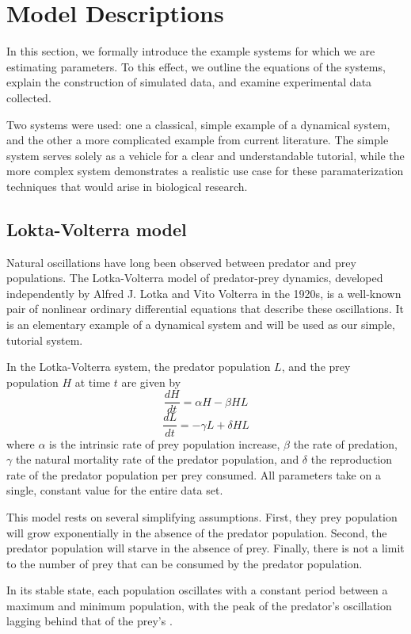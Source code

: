 \documentclass{article}
\begin{document}
\section{Model Descriptions}
In this section, we formally introduce the example systems for which we are estimating parameters. To this effect, we outline the equations of the systems, explain the construction of simulated data, and examine experimental data collected. 
\par Two systems were used: one a classical, simple example of a dynamical system, and the other a more complicated example from current literature. The simple system serves solely as a vehicle for a clear and understandable tutorial, while the more complex system demonstrates a realistic use case for these paramaterization techniques that would arise in biological research. 

\subsection{Lokta-Volterra model}
Natural oscillations have long been observed between predator and prey populations. The Lotka-Volterra model of predator-prey dynamics, developed independently by Alfred J. Lotka and Vito Volterra in the 1920s, is a well-known pair of nonlinear ordinary differential equations that describe these oscillations. It is an elementary example of a dynamical system and will be used as our simple, tutorial system.
\par In the Lotka-Volterra system, the predator population $L$, and the prey population $H$ at time $t$ are given by
\begin{equation}
\frac{dH}{dt} = \alpha H - \beta HL 
\end{equation}
\begin{equation}
\frac{dL}{dt} = -\gamma L + \delta HL
    \end{equation}
where $\alpha$ is the intrinsic rate of prey population increase, $\beta$ the rate of predation, $\gamma$ the natural mortality rate of the predator population, and $\delta$ the reproduction rate of the predator population per prey consumed. All parameters take on a single, constant value for the entire data set.
\par This model rests on several simplifying assumptions. First, they prey population will grow exponentially in the absence of the predator population. Second, the predator population will starve in the absence of prey. Finally, there is not a limit to the number of prey that can be consumed by the predator population.
\par In its stable state, each population oscillates with a constant period between a maximum and minimum population, with the peak of the predator's oscillation lagging behind that of the prey's \cite{Lotka} \cite{Volterra}. 
\end{document}

